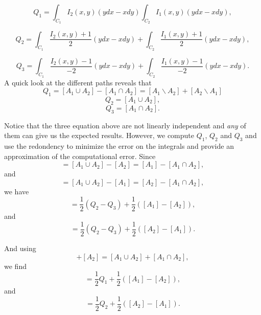 \documentclass{article}
\begin{document}
\begin{equation}
Q_1 = \int _{C_1} I_2(x,y) \left( y dx - xdy \right) \int _{C_2} I_1(x,y) \left( y dx - xdy \right),
\end{equation}

\begin{equation}
Q_2 = \int _{C_1} \frac{I_2(x,y)+1}{2} \left( y dx - xdy \right) + \int _{C_2} \frac{I_1(x,y)+1}{2} \left( y dx - xdy \right),
\end{equation}

\begin{equation}
Q_3 = \int _{C_1} \frac{I_2(x,y)-1}{-2} \left( y dx - xdy \right) + \int _{C_2} \frac{I_1(x,y)-1}{-2} \left( y dx - xdy \right).
\end{equation} A quick look at the different paths reveals that
\begin{equation}
Q_1=[A_1\cup A_2] - [A_1\cap A_2] = [A_1\backslash A_2] +[A_2\backslash A_1]
\end{equation}
\begin{equation}
Q_2=[A_1\cup A_2] ,
\end{equation}
\begin{equation}
Q_3=[A_1\cap A_2] .
\end{equation}

Notice that the three equation above are not linearly independent and {\em any} of them can give us the expected results. However, we compute $Q_1$, $Q_2$ and $Q_3$ and use the redondency to minimize the error on the integrals and provide an approximation of the computational error. Since
\begin{equation}
[A_1 \backslash A_2] = [A_1 \cup A_2] - [A_2] = [A_1] - [A_1\cap A_2] ,
\end{equation} and
\begin{equation}
[A_2 \backslash A_1] = [A_1 \cup A_2] - [A_1] = [A_2] - [A_1\cap A_2], 
\end{equation} we have
\begin{equation}
[A_1 \backslash A_2] = \frac{1}{2} (Q_2-Q_3) + \frac{1}{2} ([A_1]-[A_2]),
\end{equation} and
\begin{equation}
[A_2 \backslash A_1] = \frac{1}{2} (Q_2-Q_3) + \frac{1}{2} ([A_2]-[A_1]).
\end{equation}

And using
\begin{equation}
[A_1]+[A_2]=[A_1 \cup A_2]+[A_1 \cap A_2],
\end{equation} we find
\begin{equation}
[A_1 \backslash A_2] = \frac{1}{2} Q_1 + \frac{1}{2} ([A_1]-[A_2]),
\end{equation} and
\begin{equation}
[A_2 \backslash A_1] = \frac{1}{2} Q_2 + \frac{1}{2} ([A_2]-[A_1]).
\end{equation}
\end{document}

